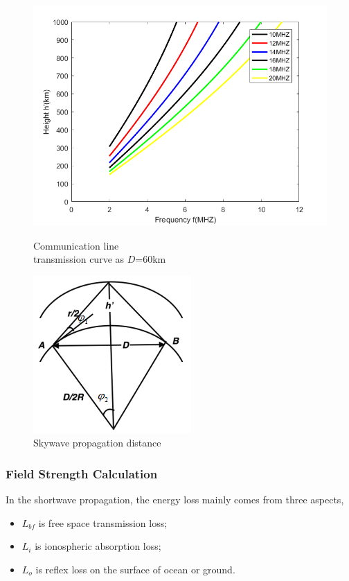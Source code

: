 \documentclass{mcmthesis}
\begin{document}
    \begin{figure}
\begin{minipage}[t]{0.5\linewidth}
\centering
\includegraphics[scale=0.45]{./figure/2.png}
\caption{Communication line  \protect\\ transmission curve as $D$=60km}
\label{fig:side:a}
\end{minipage}%
\begin{minipage}[t]{0.5\linewidth}
\centering
\includegraphics[scale=0.4]{./figure/hh.png}
\caption{Skywave propagation distance}
\label{fig:side:b}
\end{minipage}
\end{figure}   
    
    \subsubsection{Field Strength Calculation}
In the shortwave propagation, the energy loss mainly comes from three aspects,
\begin{itemize}
\item $L_{bf}$ is free space transmission loss;
\item $L_i$ is ionospheric absorption loss;
\item $L_o$ is reflex loss on the surface of ocean or ground. 
\end{itemize}
\end{document}
